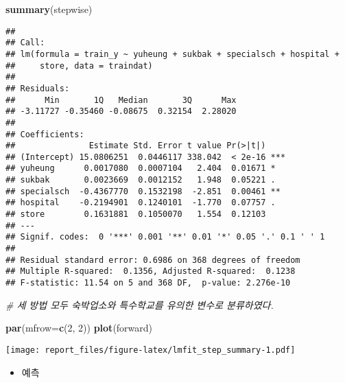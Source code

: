\documentclass[]{article}
\newenvironment{Shaded}{\begin{snugshade}}{\end{snugshade}}
\newcommand{\CommentTok}[1]{\textcolor[rgb]{0.56,0.35,0.01}{\textit{#1}}}
\newcommand{\DataTypeTok}[1]{\textcolor[rgb]{0.13,0.29,0.53}{#1}}
\newcommand{\DecValTok}[1]{\textcolor[rgb]{0.00,0.00,0.81}{#1}}
\newcommand{\KeywordTok}[1]{\textcolor[rgb]{0.13,0.29,0.53}{\textbf{#1}}}
\newcommand{\NormalTok}[1]{#1}
\newcommand{\OperatorTok}[1]{\textcolor[rgb]{0.81,0.36,0.00}{\textbf{#1}}}
\newcommand{\StringTok}[1]{\textcolor[rgb]{0.31,0.60,0.02}{#1}}
\providecommand{\tightlist}{%
  \setlength{\itemsep}{0pt}\setlength{\parskip}{0pt}}
\begin{document}
\begin{Shaded}
\begin{Highlighting}[]
\KeywordTok{summary}\NormalTok{(stepwise)}
\end{Highlighting}
\end{Shaded}

\begin{verbatim}
## 
## Call:
## lm(formula = train_y ~ yuheung + sukbak + specialsch + hospital + 
##     store, data = traindat)
## 
## Residuals:
##      Min       1Q   Median       3Q      Max 
## -3.11727 -0.35460 -0.08675  0.32154  2.28020 
## 
## Coefficients:
##               Estimate Std. Error t value Pr(>|t|)    
## (Intercept) 15.0806251  0.0446117 338.042  < 2e-16 ***
## yuheung      0.0017080  0.0007104   2.404  0.01671 *  
## sukbak       0.0023669  0.0012152   1.948  0.05221 .  
## specialsch  -0.4367770  0.1532198  -2.851  0.00461 ** 
## hospital    -0.2194901  0.1240101  -1.770  0.07757 .  
## store        0.1631881  0.1050070   1.554  0.12103    
## ---
## Signif. codes:  0 '***' 0.001 '**' 0.01 '*' 0.05 '.' 0.1 ' ' 1
## 
## Residual standard error: 0.6986 on 368 degrees of freedom
## Multiple R-squared:  0.1356, Adjusted R-squared:  0.1238 
## F-statistic: 11.54 on 5 and 368 DF,  p-value: 2.276e-10
\end{verbatim}

\begin{Shaded}
\begin{Highlighting}[]
\CommentTok{# 세 방법 모두 숙박업소와 특수학교를 유의한 변수로 분류하였다.}

\KeywordTok{par}\NormalTok{(}\DataTypeTok{mfrow=}\KeywordTok{c}\NormalTok{(}\DecValTok{2}\NormalTok{, }\DecValTok{2}\NormalTok{))}
\KeywordTok{plot}\NormalTok{(forward)}
\end{Highlighting}
\end{Shaded}

\texttt{[image: report\_files/figure-latex/lmfit\_step\_summary-1.pdf]}

\begin{itemize}
\tightlist
\item
  예측
\end{itemize}

\begin{Shaded}
\end{Shaded}
\end{document}
